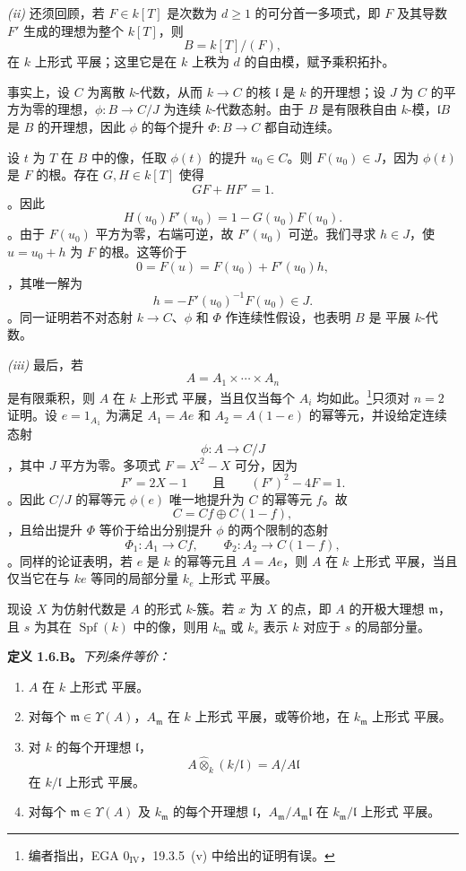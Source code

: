 \smallskip\noindent\textit{(ii)} 还须回顾，若 \(F\in k[T]\) 是次数为 \(d\geq1\) 的可分首一多项式，即 \(F\) 及其导数 \(F'\) 生成的理想为整个 \(k[T]\)，则 \[
  B=k[T]/(F),
\] 在 \(k\) 上形式 平展；这里它是在 \(k\) 上秩为 \(d\) 的自由模，赋予乘积拓扑。

事实上，设 \(C\) 为离散 \(k\)-代数，从而 \(k\to C\) 的核 \(\mathfrak l\) 是 \(k\) 的开理想；设 \(J\) 为 \(C\) 的平方为零的理想，\(\phi:B\to C/J\) 为连续 \(k\)-代数态射。由于 \(B\) 是有限秩自由 \(k\)-模，\(\mathfrak lB\) 是 \(B\) 的开理想，因此 \(\phi\) 的每个提升 \(\Phi:B\to C\) 都自动连续。

设 \(t\) 为 \(T\) 在 \(B\) 中的像，任取 \(\phi(t)\) 的提升 \(u_0\in C\)。则 \(F(u_0)\in J\)，因为 \(\phi(t)\) 是 \(F\) 的根。存在 \(G,H\in k[T]\) 使得 \[
  GF+HF'=1.
\]。因此 \[
  H(u_0)F'(u_0)=1-G(u_0)F(u_0).
\]。由于 \(F(u_0)\) 平方为零，右端可逆，故 \(F'(u_0)\) 可逆。我们寻求 \(h\in J\)，使 \(u=u_0+h\) 为 \(F\) 的根。这等价于 \[
  0=F(u)=F(u_0)+F'(u_0)h,
\]，其唯一解为 \[
  h=-F'(u_0)^{-1}F(u_0)\in J.
\]。同一证明若不对态射 \(k\to C\)、\(\phi\) 和 \(\Phi\) 作连续性假设，也表明 \(B\) 是 平展 \(k\)-代数。

\smallskip\noindent\textit{(iii)} 最后，若 \[
  A=A_1\times\cdots\times A_n
\] 是有限乘积，则 \(A\) 在 \(k\) 上形式 平展，当且仅当每个 \(A_i\) 均如此。\footnote{\label{sga3:VIIB:nde:71}编者指出，EGA \(0_{\mathrm{IV}}\)，19.3.5~(v) 中给出的证明有误。}只须对 \(n=2\) 证明。设 \(e=1_{A_1}\) 为满足 \(A_1=Ae\) 和 \(A_2=A(1-e)\) 的幂等元，并设给定连续态射 \[
  \phi:A\longrightarrow C/J
\]，其中 \(J\) 平方为零。多项式 \(F=X^2-X\) 可分，因为 \[
  F'=2X-1
  \qquad\text{且}\qquad
  (F')^2-4F=1.
\]。因此 \(C/J\) 的幂等元 \(\phi(e)\) 唯一地提升为 \(C\) 的幂等元 \(f\)。故 \[
  C=Cf\oplus C(1-f),
\]，且给出提升 \(\Phi\) 等价于给出分别提升 \(\phi\) 的两个限制的态射 \[
  \Phi_1:A_1\longrightarrow Cf,
  \qquad
  \Phi_2:A_2\longrightarrow C(1-f),
\]。同样的论证表明，若 \(e\) 是 \(k\) 的幂等元且 \(A=Ae\)，则 \(A\) 在 \(k\) 上形式 平展，当且仅当它在与 \(ke\) 等同的局部分量 \(k_e\) 上形式 平展。

现设 \(X\) 为仿射代数是 \(A\) 的形式 \(k\)-簇。若 \(x\) 为 \(X\) 的点，即 \(A\) 的开极大理想 \(\mathfrak m\)，且 \(s\) 为其在 \(\operatorname{Spf}(k)\) 中的像，则用 \(k_{\mathfrak m}\) 或 \(k_s\) 表示 \(k\) 对应于 \(s\) 的局部分量。

\medskip\noindent\textbf{定义 1.6.B。} \label{sga3:VIIB:1.6.B}\textit{下列条件等价：}\begin{enumerate}\item[\textup{(a)}]\(A\) 在 \(k\) 上形式 平展。\item[\textup{(b)}]对每个 \(\mathfrak m\in\Upsilon(A)\)，\(A_{\mathfrak m}\) 在 \(k\) 上形式 平展，或等价地，在 \(k_{\mathfrak m}\) 上形式 平展。\item[\textup{(c)}]对 \(k\) 的每个开理想 \(\mathfrak l\)，\[
    A\widehat\otimes_k(k/\mathfrak l)
    =
    A/A\mathfrak l
  \] 在 \(k/\mathfrak l\) 上形式 平展。\item[\textup{(d)}]对每个 \(\mathfrak m\in\Upsilon(A)\) 及 \(k_{\mathfrak m}\) 的每个开理想 \(\mathfrak l\)，\(A_{\mathfrak m}/A_{\mathfrak m}\mathfrak l\) 在 \(k_{\mathfrak m}/\mathfrak l\) 上形式 平展。\end{enumerate}

